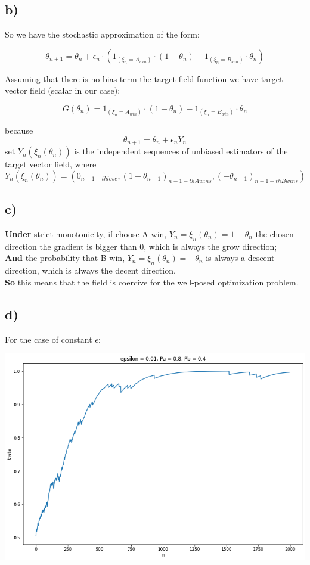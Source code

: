 \documentclass{article}
\begin{document}
\subsection{b)} 

So we have the stochastic approximation of the form:

$$\theta_{n+1}=\theta_{n} + \epsilon_{n}\cdot (\mathrm{1}_{(\xi_{n}=A_{win})}\cdot(1-\theta_{n}) - \mathrm{1}_{(\xi_{n}=B_{win})}\cdot\theta_{n})$$

Assuming that there is no bias term the target field function we have target vector field (scalar in our case):

$$G(\theta_{n})=\mathrm{1}_{(\xi_{n}=A_{win})}\cdot(1-\theta_{n}) - \mathrm{1}_{(\xi_{n}=B_{win})}\cdot\theta_{n}$$

because $$ \theta_{n+1} = \theta_n+\epsilon_nY_n $$ 
set $Y_n(\xi_n(\theta_n))$ is the independent sequences of unbiased estimators of the target vector field, where
$$Y_n(\xi_n(\theta_n)) = (0_{n-1-th lose}, (1-\theta_{n-1})_{n-1-th A wins}, (-\theta_{n-1})_{n-1-th B wins}) $$


\subsection{c)} 

\textbf{Under} strict monotonicity, if choose A win, $Y_n=\xi_n(\theta_n) = 1-\theta_n$ the chosen direction the gradient is bigger than 0, which is always the grow direction;  \\
\textbf{And} the probability that B win,  $Y_n=\xi_n(\theta_n) = -\theta_n$ is always a descent direction, which is always the decent direction. \\
\textbf{So} this means that the field is coercive for the well-posed optimization problem.  \\

\subsection{d)}

For the case of constant $\epsilon$:

\includegraphics[width=0.9\linewidth]{const_a.png}\\
\end{document}
